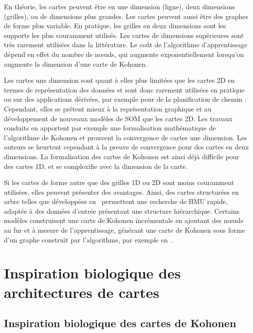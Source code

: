 \documentclass[../main]{subfiles}
\begin{document}
En théorie, les cartes peuvent être en une dimension (ligne), deux dimensions (grilles), ou de dimensions plus grandes. Les cartes peuvent aussi être des graphes de forme plus variable. 
En pratique, les grilles en deux dimensions sont les supports les plus couramment utilisés. Les cartes de dimensions supérieures sont très rarement utilisées dans la littérature. 
Le coût de l'algorithme d'apprentissage dépend en effet du nombre de n\oe{}uds, qui augmente exponentiellement lorsqu'on augmente la dimension d'une carte de Kohonen.

Les cartes une dimension sont quant à elles plus limitées que les cartes 2D en termes de représentation des données et sont donc rarement utilisées en pratique ou sur des applications dérivées, par exemple pour de la planification de chemin \parencite{FrezzaBuet2020SelforganizingMI}.
Cependant, elles se prêtent mieux à la représentation graphique et au développement de nouveaux modèles de SOM que les cartes 2D.
Les travaux conduits en \cite{Cottrell1998TheoreticalAO, fort_soms_2006, cottrell_theoretical_2016} apportent par exemple une formalisation mathématique de l'algorithme de Kohonen et prouvent la convergence de cartes une dimension. Les auteurs se heurtent cependant à la preuve de convergence pour des cartes en deux dimensions. 
La formalisation des cartes de Kohonen est ainsi déjà difficile pour des cartes 1D, et se complexifie avec la dimension de la carte.

Si les cartes de forme autre que des grilles 1D ou 2D sont moins couramment utilisées, elles peuvent présenter des avantages. Ainsi, des cartes structurées en arbre telles que développées en~\cite{koikkalainen_self-organizing_1990} permettent une recherche de BMU rapide, adaptée à des données d'entrée présentant une structure hiérarchique. Certains modèles construisent une carte de Kohonen incrémentale en ajoutant des n\oe{}uds au fur et à mesure de l'apprentissage, générant une carte de Kohonen sous forme d'un graphe construit par l'algorithme, par exemple en~\cite{Fritzke1995GrowingG, alahakoon_dynamic_2000, yamaguchi_adaptive_2010}.

\section{Inspiration biologique des architectures de cartes}\label{sec:bioinspi}

\subsection{Inspiration biologique des cartes de Kohonen}
\end{document}
